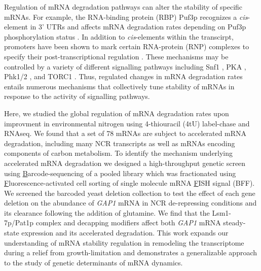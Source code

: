 Regulation of mRNA degradation pathways can alter the stability of
specific mRNAs. For example, the RNA-binding protein (RBP) Puf3p
recognizes a \textit{cis}-element in 3' UTRs \parencite{olivas2000puf3}
and affects mRNA degradation rates depending on
Puf3p phosphorylation status \parencite{lee2015glucose}. 
In addition to \textit{cis}-elements within the transcirpt, 
promoters have
been shown to mark certain RNA-protein (RNP) complexes to specify
their post-transcriptional regulation
\parencite{mercado1994levels,haimovich2013gene,trcek2011single,braun2016snf1}. These
mechanisms may be controlled by a variety of different signalling
pathways including Snf1
\parencite{young2012amp,braun2014phosphoproteomic}, PKA
\parencite{ramachandran2011camp}, Phk1/2 \parencite{luo2011nutrients}, and TORC1
\parencite{talarek2010initiation}. Thus, regulated changes in  mRNA degradation
rates entails numerous mechanisms that collectively tune stability of
mRNAs in response to the activity of signalling pathways. 

Here, we studied the global regulation of mRNA degradation rates upon
improvment in environmental nitrogen using 4-thiouracil (4tU) 
label-chase and RNAseq.
We found that a set of 78 mRNAs are subject to accelerated mRNA
degradation, including many NCR transcripts as well as mRNAs
encoding components of
carbon metabolism. To identify the mechanism underlying accelerated
mRNA degradation we designed a high-throughput genetic screen using 
\underline{B}arcode-sequencing of a pooled library which was
fractionated using \underline{F}luorescence-activated cell 
sorting of single molecule mRNA \underline{F}ISH signal (BFF). 
We screened the barcoded
yeast deletion collection to test the effect of each gene deletion
on the abundance of \textit{GAP1} mRNA in NCR de-repressing 
conditions and its clearance following the 
addition of glutamine. We
find that the Lsm1-7p/Pat1p complex and decapping modifiers affect
both \textit{GAP1} mRNA steady-state expression and its 
accelerated degradation.
This work expands our
understanding of mRNA stability regulation in remodeling the
transcriptome during a relief from growth-limitation and demonstrates
a generalizable approach to the study of genetic determinants of mRNA
dynamics.



